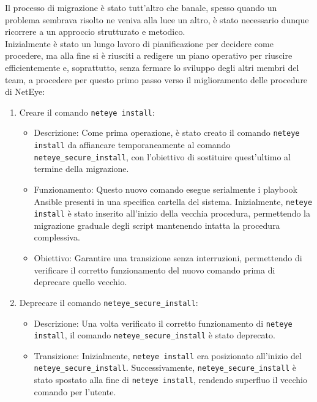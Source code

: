 Il processo di migrazione è stato tutt'altro che banale, spesso quando un
problema sembrava risolto ne veniva alla luce un altro, è stato necessario dunque
ricorrere a un approccio strutturato e metodico.\\ Inizialmente è stato un lungo
lavoro di pianificazione per decidere come procedere, ma alla fine si è riusciti
a redigere un piano operativo per riuscire efficientemente e, soprattutto, senza
fermare lo sviluppo degli altri membri del team, a procedere per questo primo passo
verso il miglioramento delle procedure di NetEye:
\begin{enumerate}
  \item Creare il comando \texttt{neteye install}:
    \begin{itemize}
      \item Descrizione: Come prima operazione, è stato creato il comando \texttt{neteye
        install} da affiancare temporaneamente al comando \texttt{neteye\_secure\_install},
        con l'obiettivo di sostituire quest'ultimo al termine della migrazione.

      \item Funzionamento: Questo nuovo comando esegue serialmente i playbook
        Ansible presenti in una specifica cartella del sistema. Inizialmente,
        \texttt{neteye install} è stato inserito all'inizio della vecchia procedura,
        permettendo la migrazione graduale degli script mantenendo intatta la
        procedura complessiva.

      \item Obiettivo: Garantire una transizione senza interruzioni, permettendo
        di verificare il corretto funzionamento del nuovo comando prima di deprecare
        quello vecchio.
    \end{itemize}

  \item Deprecare il comando \texttt{neteye\_secure\_install}:
    \begin{itemize}
      \item Descrizione: Una volta verificato il corretto funzionamento di
        \texttt{neteye install}, il comando \texttt{neteye\_secure\_install} è stato
        deprecato.

      \item Transizione: Inizialmente, \texttt{neteye install} era posizionato
        all'inizio del \texttt{neteye\_secure\_install}. Successivamente, \texttt{neteye\_secure\_install}
        è stato spostato alla fine di \texttt{neteye install}, rendendo
        superfluo il vecchio comando per l'utente.


\end{itemize}
\end{enumerate}
